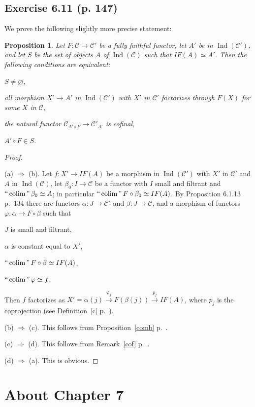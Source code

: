 \documentclass[12pt]{article}
\newtheorem{prop}[thm]{Proposition}
\theoremstyle{remark}
\theoremstyle{definition}
\newcommand{\cc}{\mathcal}
\newcommand{\then}{\Rightarrow}
\newcommand{\xr}{\xrightarrow}
\DeclareMathOperator*{\coli}{colim}
\DeclareMathOperator*{\ic}{``\coli"}
\DeclareMathOperator{\Ind}{Ind}
\begin{document}
\subsection{Exercise 6.11 (p. 147)} 
%
We prove the following slightly more precise statement:
%
\begin{prop}\label{myprop1}
%
Let $F:\cc C\to\cc C'$ be a fully faithful functor, let $A'$ be in $\Ind(\cc C')$, and let $S$ be the set of objects $A$ of $\Ind(\cc C)$ such that $IF(A)\simeq A'$. Then the following conditions are equivalent: 

 $S\neq\varnothing$, 

 all morphism $X'\to A'$ in $\Ind(\cc C')$ with $X'$ in $\cc C'$ factorizes through $F(X)$ for some $X$ in $\cc C$, 

 the natural functor $\cc C_{A'\circ F}\to\cc C'_{A'}$ is cofinal, 

 $A'\circ F\in S$.
%
\end{prop}
%
\begin{proof}\ 

\noindent(a) $\then$ (b). Let $f:X'\to IF(A)$ be a morphism in $\Ind(\cc C')$ with $X'$ in $\cc C'$ and $A$ in $\Ind(\cc C)$, let $\beta_0:I\to\cc C$ be a functor with $I$ small and filtrant and $\ic\beta_0\simeq A$; in particular $\ic F\circ\beta_0\simeq IF(A)$. By Proposition 6.1.13 p.~134 there are functors $\alpha:J\to\cc C'$ and $\beta:J\to\cc C$, and a morphism of functors $\varphi:\alpha\to F\circ\beta$ such that 

$J$ is small and filtrant, 

$\alpha$ is constant equal to $X'$, 

$\ic F\circ\beta\simeq IF(A)$, 

$\ic\varphi\simeq f$. 

\noindent Then $f$ factorizes as $X'=\alpha(j)\xr{\varphi_j}F(\beta(j))\xr{p_j}IF(A)$, where $p_j$ is the coprojection (see Definition~\ref{c} p.~\pageref{c}).

\noindent(b) $\then$ (c). This follows from Proposition~\ref{comb} p.~\pageref{comb}. 

\noindent(c) $\then$ (d). This follows from Remark~\ref{cof} p.~\pageref{cof}. 

\noindent(d) $\then$ (a). This is obvious.
\end{proof}
%
%
\section{About Chapter 7}
%
\end{document}
